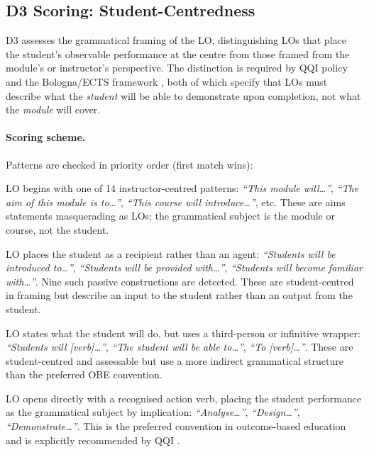 \documentclass[12pt, a4paper]{article}
\begin{document}
\subsection{D3 Scoring: Student-Centredness}
\label{sec:d3}

D3 assesses the grammatical framing of the LO, distinguishing LOs that place the
student's observable performance at the centre from those framed from the module's
or instructor's perspective. The distinction is required by QQI policy
\citeyear{qqi2016core} and the Bologna/ECTS framework \citeyear{ec2015ects}, both
of which specify that LOs must describe what the \textit{student} will be able
to demonstrate upon completion, not what the \textit{module} will cover.

\paragraph{Scoring scheme.}
Patterns are checked in priority order (first match wins):

\begin{description}[leftmargin=3em, labelwidth=2.5em]
  \item[D3 = 0 — Instructor/module-centred] LO begins with one of 14 instructor-centred
    patterns: \textit{``This module will\ldots''}, \textit{``The aim of this module
    is to\ldots''}, \textit{``This course will introduce\ldots''}, etc.
    These are aims statements masquerading as LOs; the grammatical subject is the
    module or course, not the student.
  \item[D3 = 1 — Passive student] LO places the student as a recipient rather than an
    agent: \textit{``Students will be introduced to\ldots''}, \textit{``Students will
    be provided with\ldots''}, \textit{``Students will become familiar with\ldots''}.
    Nine such passive constructions are detected. These are student-centred in framing
    but describe an input to the student rather than an output from the student.
  \item[D3 = 2 — Active student, indirect framing] LO states what the student will do,
    but uses a third-person or infinitive wrapper: \textit{``Students will [verb]\ldots''},
    \textit{``The student will be able to\ldots''}, \textit{``To [verb]\ldots''}.
    These are student-centred and assessable but use a more indirect grammatical
    structure than the preferred OBE convention.
  \item[D3 = 3 — Verb-first imperative] LO opens directly with a recognised action verb,
    placing the student performance as the grammatical subject by implication:
    \textit{``Analyse\ldots''}, \textit{``Design\ldots''}, \textit{``Demonstrate\ldots''}.
    This is the preferred convention in outcome-based education
    \citep{biggs2011teaching} and is explicitly recommended by QQI \citeyear{qqi2016core}.
\end{description}
\end{document}
